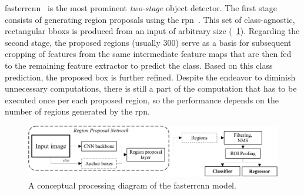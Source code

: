 \gls{fasterrcnn}~\cite{ren2017fasterrcnn} is the most prominent \emph{two-stage} object detector. The first stage consists of generating region proposals using the \gls{rpn}~\cite{huang2017speedacctradeoff}. This set of class-agnostic, rectangular \glspl{bbox} is produced from an input of arbitrary size (\figtext{}~\ref{fig:FasterRCNNPipeline}). Regarding the second stage, the proposed regions (usually $300$) serve as a basis for subsequent cropping of features from the same intermediate feature maps that are then fed to the remaining feature extractor to predict the class. Based on this class prediction, the proposed box is further refined. Despite the endeavor to diminish unnecessary computations, there is still a part of the computation that has to be executed once per each proposed region, so the performance depends on the number of regions generated by the \gls{rpn}.

\begin{figure}[t]
    \centerline{\includegraphics[width=\linewidth]{figures/theoretical_foundations/fastercnn_diagram.pdf}}
    \caption[\gls{fasterrcnn}]{A conceptual processing diagram of the \gls{fasterrcnn} model.}
    \label{fig:FasterRCNNPipeline}
\end{figure}
